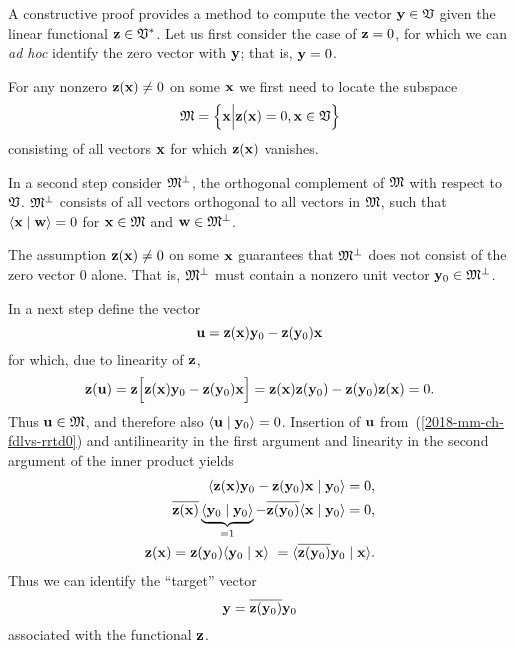 {\color{OliveGreen}
\bproof
A constructive proof
provides a method to compute the vector ${\bf y} \in {\frak V}$
given the linear functional
${\bf z} \in {\frak V}^\ast$.
Let us first consider the case
of ${\bf z} =0$, for which we can {\it ad hoc} identify
the zero vector with ${\bf y}$; that is, ${\bf y}=0$.

For any nonzero ${\bf z}({\bf x}) \neq 0$  on some ${\bf x}$ we first need to locate the subspace
\begin{equation}
{\frak M}= \Big\{ {\bf x} \Big| {\bf z}({\bf x}) = 0, {\bf x} \in {\frak V} \Big\}
\end{equation}
consisting of all vectors ${\bf x}$ for which ${\bf z}({\bf x})$ vanishes.

In a second step consider ${\frak M}^\perp$, the orthogonal complement of ${\frak M}$ with respect to ${\frak V}$.
${\frak M}^\perp$ consists of all vectors  orthogonal to all vectors in  ${\frak M}$,
such that $\langle {\bf x}\mid {\bf w} \rangle =0$ for ${\bf x}\in {\frak M}$ and ${\bf w}\in {\frak M}^\perp$.

The assumption ${\bf z}({\bf x}) \neq 0$  on some ${\bf x}$
guarantees that  ${\frak M}^\perp$ does not consist of the zero vector $0$ alone.
That is, ${\frak M}^\perp$ must contain a nonzero unit vector ${\bf y}_0\in {\frak M}^\perp$.

In a next step define the vector
\begin{equation}
 {\bf u} = {\bf z}({\bf x}) {\bf y}_0 - {\bf z}({\bf y}_0) {\bf x}
\label{2018-mm-ch-fdlvs-rrtd0}
\end{equation}
for which, due to linearity of ${\bf z}$,
\begin{equation}
 {\bf z}({\bf u}) = {\bf z}\Big[{\bf z}({\bf x}) {\bf y}_0 - {\bf z}({\bf y}_0)   {\bf x}\Big]
= {\bf z}({\bf x}) {\bf z}({\bf y}_0) - {\bf z}({\bf y}_0) {\bf z}({\bf x})
=0
.
\label{2018-mm-ch-fdlvs-rrtd1}
\end{equation}
Thus ${\bf u} \in {\frak M}$, and therefore also $\langle {\bf u} \mid {\bf y}_0 \rangle =0$.
Insertion of ${\bf u}$ from~(\ref{2018-mm-ch-fdlvs-rrtd0})
and antilinearity in the first argument and linearity in the second argument  of the inner product yields
\begin{equation}
\begin{split}
 \langle {\bf z}({\bf x}) {\bf y}_0  - {\bf z}({\bf y}_0) {\bf x} \mid  {\bf y}_0 \rangle=0,\\
\overline{{\bf z}({\bf x})} \underbrace{\langle {\bf y}_0 \mid  {\bf y}_0 \rangle}_{=1}
               - \overline{{\bf z}({\bf y}_0)} \langle {\bf x} \mid  {\bf y}_0 \rangle=0,\\
{\bf z}({\bf x}) = {\bf z}({\bf y}_0) \langle    {\bf y}_0\mid  {\bf x}\rangle\
=  \langle   \overline{{\bf z}({\bf y}_0)} {\bf y}_0\mid  {\bf x}\rangle
.
\end{split}
\label{2018-mm-ch-fdlvs-rrtd2}
\end{equation}
Thus we can identify the ``target'' vector
\begin{equation}
{\bf y} =  \overline{{\bf z}({\bf y}_0)} {\bf y}_0
\label{2018-mm-ch-fdlvs-rrtdtv}
\end{equation}
associated with the functional ${\bf z}$.

}
